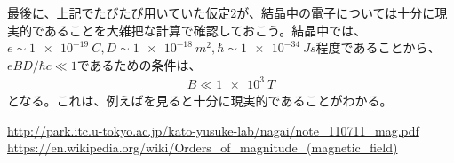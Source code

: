 \documentclass[uplatex,dvipdfmx, a4j]{jsarticle}
\begin{document}
最後に、上記でたびたび用いていた仮定2が、結晶中の電子については十分に現実的であることを大雑把な計算で確認しておこう。結晶中では、$e \sim \SI{1e-19}{C}, D \sim \SI{1e-18}{m^2}, \hbar\sim\SI{1e-34}{Js}$程度であることから、$eBD/\hbar c\ll 1$であるための条件は、
\begin{align}
	B \ll \SI{1e3}{T}
\end{align}
となる。これは、例えば\cite{wiki_magnitude}を見ると十分に現実的であることがわかる。

\begin{thebibliography}{99}
	 \url{http://park.itc.u-tokyo.ac.jp/kato-yusuke-lab/nagai/note_110711_mag.pdf}
	 \url{https://en.wikipedia.org/wiki/Orders_of_magnitude_(magnetic_field)}
\end{thebibliography}
\end{document}
